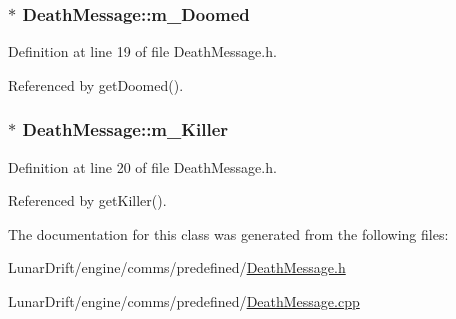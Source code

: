 \subsubsection[{\texorpdfstring{m\+\_\+\+Doomed}{m_Doomed}}]{$\ast$ Death\+Message\+::m\+\_\+\+Doomed\hspace{0.3cm}{\ttfamily [private]}}\hypertarget{class_death_message_a34cafaafa984ec952e2cb23dc5de64b5}{}\label{class_death_message_a34cafaafa984ec952e2cb23dc5de64b5}


Definition at line 19 of file Death\+Message.\+h.



Referenced by get\+Doomed().

\subsubsection[{\texorpdfstring{m\+\_\+\+Killer}{m_Killer}}]{$\ast$ Death\+Message\+::m\+\_\+\+Killer\hspace{0.3cm}{\ttfamily [private]}}\hypertarget{class_death_message_a34e6b366368536231d282a6934042b73}{}\label{class_death_message_a34e6b366368536231d282a6934042b73}


Definition at line 20 of file Death\+Message.\+h.



Referenced by get\+Killer().



The documentation for this class was generated from the following files\+:\begin{DoxyCompactItemize}
\item 
Lunar\+Drift/engine/comms/predefined/\hyperlink{_death_message_8h}{Death\+Message.\+h}\item 
Lunar\+Drift/engine/comms/predefined/\hyperlink{_death_message_8cpp}{Death\+Message.\+cpp}\end{DoxyCompactItemize}
